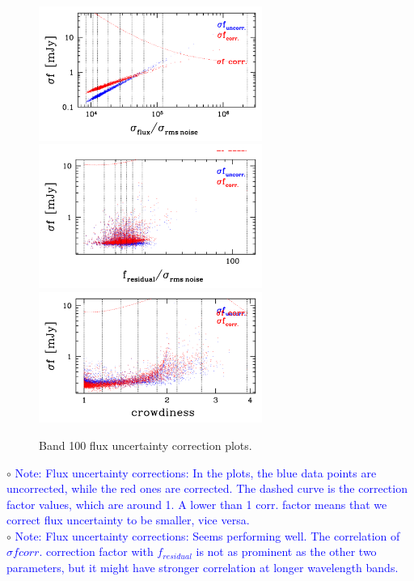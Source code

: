 \documentclass[11pt,a4paper]{article}
\begin{document}
\begin{figure}[H]
	\caption{
		Band 100 flux uncertainty correction plots.
	}
	\includegraphics[width=0.65\textwidth]{galsim_100_dfcorr_1}
	\includegraphics[width=0.65\textwidth]{galsim_100_dfcorr_2}
	\includegraphics[width=0.65\textwidth]{galsim_100_dfcorr_3}
\end{figure}

\indent\hspace{15pt}$\circ$ 
\textcolor{blue}{Note: Flux uncertainty corrections: In the plots, the blue data points are uncorrected, while the red ones are corrected. The dashed curve is the correction factor values, which are around 1. A lower than 1 corr. factor means that we correct flux uncertainty to be smaller, vice versa. }
\\
\indent\hspace{15pt}$\circ$ 
\textcolor{blue}{Note: Flux uncertainty corrections: Seems performing well. The correlation of $\sigma{f}corr.$ correction factor with $f_{residual}$ is not as prominent as the other two parameters, but it might have stronger correlation at longer wavelength bands.}
\\
\end{document}
